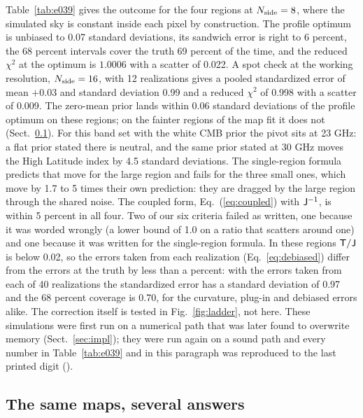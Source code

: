 Table~\ref{tab:e039} gives the outcome for the four regions at $N_{\rm side}=8$, where the simulated
sky is constant inside each pixel by construction. The profile optimum is unbiased to 0.07 standard
deviations, its sandwich error is right to 6 percent, the 68 percent intervals cover the truth 69
percent of the time, and the reduced $\chi^2$ at the optimum is $1.0006$ with a scatter of 0.022. A
spot check at the working resolution, $N_{\rm side}=16$, with 12 realizations gives a pooled
standardized error of mean $+0.03$ and standard deviation 0.99 and a reduced $\chi^2$ of 0.998 with a
scatter of 0.009. The zero-mean prior lands within 0.06 standard deviations of the profile optimum on these
regions; on the fainter regions of the map fit it does not (Sect.~\ref{sec:same}). For this
band set with the white CMB prior the pivot sits at 23 GHz: a flat prior stated there is neutral, and
the same prior stated at 30 GHz moves the High Latitude index by 4.5 standard deviations. The
single-region formula predicts that move for the large region and fails for the three small ones,
which move by 1.7 to 5 times their own prediction: they are dragged by the large region through the
shared noise. The coupled form, Eq.~(\ref{eq:coupled}) with $\mathsf{J}^{-1}$, is within 5 percent in all four. Two of our
six criteria failed as written, one because it was worded wrongly (a lower bound of 1.0 on a ratio
that scatters around one) and one because it was written for the single-region formula. In these
regions $\mathsf{T}/\mathsf{J}$ is below 0.02, so the errors taken from each realization (Eq.~\ref{eq:debiased})
differ from the errors at the truth by less than a percent: with the errors taken from each of 40
realizations the standardized error has a standard deviation of 0.97 and the 68 percent coverage is
0.70, for the curvature, plug-in and debiased errors alike. The correction itself is tested in
Fig.~\ref{fig:ladder}, not here.
These simulations were first run on a numerical path that was later found to overwrite memory
(Sect.~\ref{sec:impl}); they were run again on a sound path and every number in
Table~\ref{tab:e039} and in this paragraph was reproduced to the last printed digit ().

\subsection{The same maps, several answers}
\label{sec:same}

